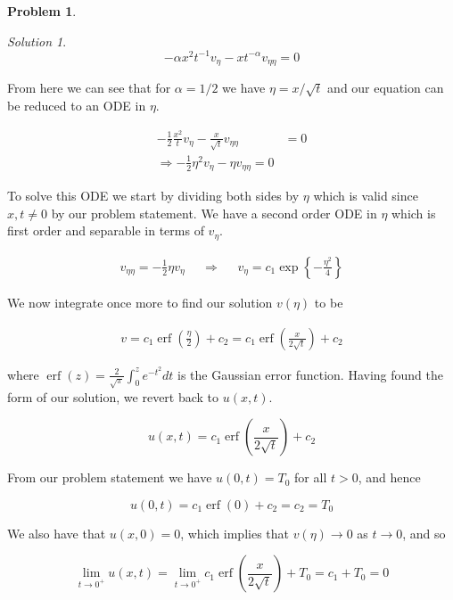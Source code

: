 \documentclass[12pt,a4paper]{article}
\theoremstyle{definition}
\newtheorem{problem}{Problem}
\theoremstyle{remark}
\newtheorem*{solution}{Solution}
\begin{document}
\begin{problem}
\begin{enumerate}
\begin{solution}
            $$-\alpha x^2 t^{-1} v_\eta - xt^{-\alpha} v_{\eta\eta}=0$$

            From here we can see that for $\alpha = 1/2$ we have $\eta = x/\sqrt t$ and our equation can be reduced to an ODE in $\eta$.

            \begin{align*}
                -\frac{1}{2} \frac{x^2}{t} v_\eta - \frac{x}{\sqrt{t}} v_{\eta\eta} &= 0 \\
                \Rightarrow -\frac{1}{2} \eta^2 v_\eta - \eta v_{\eta\eta}=0
            \end{align*}

            To solve this ODE we start by dividing both sides by $\eta$ which is valid since $x,t \ne 0$ by our problem statement. We have a second order ODE in $\eta$ which is first order and separable in terms of $v_\eta$. 

            \begin{align*}
                v_{\eta\eta} = -\frac{1}{2} \eta v_\eta && \Rightarrow && v_\eta = c_1 \exp \left\{ -\frac{\eta^2}{4} \right\}
            \end{align*}

            We now integrate once more to find our solution $v(\eta)$ to be 

            \begin{align*}
                v = c_1 \operatorname{erf}\left( \frac{\eta}{2} \right) + c_2 = c_1 \operatorname{erf} \left( \frac{x}{2\sqrt t} \right) + c_2
            \end{align*}

            where $\operatorname{erf}(z) = \frac{2}{\sqrt \pi}\int_0^z e^{-t^2}dt$ is the Gaussian error function. Having found the form of our solution, we revert back to $u(x,t)$. 
            
            $$u(x,t) = c_1 \operatorname{erf} \left( \frac{x}{2\sqrt t} \right) + c_2$$

            From our problem statement we have $u(0,t)= T_0$ for all $t>0$, and hence 
            
            $$u(0,t) = c_1 \operatorname{erf}(0) + c_2 = c_2 = T_0$$

            We also have that $u(x,0)=0$, which implies that $v(\eta) \rightarrow 0$ as $t \rightarrow 0$, and so 

            $$\lim_{t\rightarrow 0^+} u(x,t) = \lim_{t\rightarrow 0^+} c_1 \operatorname{erf}\left( \frac{x}{2\sqrt t}\right) + T_0 = c_1 + T_0 = 0$$


\end{solution}
\end{enumerate}
\end{problem}
\end{document}
